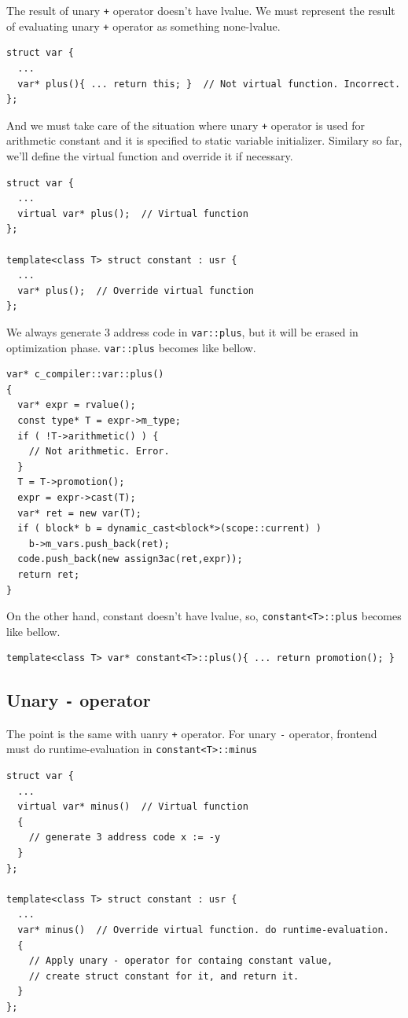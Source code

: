 The result of unary {\tt{+}} operator doesn't have lvalue.
We must represent the result of evaluating unary {\tt{+}} operator
as something none-lvalue.
\begin{verbatim}
struct var {
  ...
  var* plus(){ ... return this; }  // Not virtual function. Incorrect.
};
\end{verbatim}
And we must take care of the situation where unary {\tt{+}} operator
is used for arithmetic constant and it is specified to static 
variable initializer. Similary so far, we'll define the virtual function
and override it if necessary.
\begin{verbatim}
struct var {
  ...
  virtual var* plus();  // Virtual function
};

template<class T> struct constant : usr {
  ...
  var* plus();  // Override virtual function
};
\end{verbatim}
We always generate 3 address code in {\tt{var::plus}},
but it will be erased in optimization phase.
{\tt{var::plus}} becomes like bellow.
\begin{verbatim}
var* c_compiler::var::plus()
{
  var* expr = rvalue();
  const type* T = expr->m_type;
  if ( !T->arithmetic() ) {
    // Not arithmetic. Error.
  }
  T = T->promotion();
  expr = expr->cast(T);
  var* ret = new var(T);
  if ( block* b = dynamic_cast<block*>(scope::current) )
    b->m_vars.push_back(ret);
  code.push_back(new assign3ac(ret,expr));
  return ret;
}
\end{verbatim}
On the other hand, constant doesn't have lvalue, so,
{\tt{constant<T>::plus}} becomes like bellow.
\begin{verbatim}
template<class T> var* constant<T>::plus(){ ... return promotion(); }
\end{verbatim}

\subsection{Unary {\tt{-}} operator}
The point is the same with uanry {\tt{+}} operator.
For unary {\tt{-}} operator, frontend must do runtime-evaluation
in {\tt{constant<T>::minus}}
\begin{verbatim}
struct var {
  ...
  virtual var* minus()  // Virtual function
  {
    // generate 3 address code x := -y
  }
};

template<class T> struct constant : usr {
  ...
  var* minus()  // Override virtual function. do runtime-evaluation.
  {
    // Apply unary - operator for containg constant value,
    // create struct constant for it, and return it.
  }
};
\end{verbatim}

